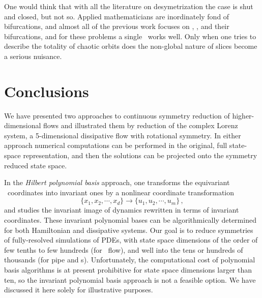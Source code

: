 \documentclass[preprint,number,sort&compress]{elsarticle}
\begin{document}
One would think that with all the literature on
desymetrization the case is shut and closed, but not so.
Applied mathematicians are inordinately fond of bifurcations,
and almost all of the previous work focuses on \eqva, \reqva,
and their bifurcations, and for these problems a single
\slice\ works well. Only when one tries to describe the
totality of chaotic orbits does the non-global nature of
slices become a serious nuisance.


\section{\label{sec:concl} Conclusions}

We have presented two approaches to continuous symmetry
reduction of higher-dimensional flows and illustrated them
by reduction of the complex Lorenz system, a 5-dimensional
dissipative flow with rotational symmetry.
In either approach numerical computations can be performed in
the original, full state-space representation, and then the
solutions can be projected onto the symmetry reduced state
space.

In the {\em Hilbert polynomial basis} approach, one transforms
the equi\-vari\-ant \statesp\ coordinates into in\-vari\-ant ones by
a nonlinear coordinate transformation
\[
\{x_1,x_2,\cdots,x_d\} \to \{u_1,u_2,\cdots,u_m\}
\,,
\]
and studies the in\-vari\-ant image of dynamics rewritten in
terms of in\-vari\-ant coordinates. These in\-vari\-ant polynomial
bases can be algorithmically determined for both Hamiltonian
and dissipative systems. Our goal is to reduce symmetries of
fully-resolved simulations of PDEs, with state space
dimensions of the order of few tenths to few hundreds (for
\KS\ flow), and well into the tens or hundreds of thousands (for pipe
and \pCf s). Unfortunately, the computational cost of
polynomial basis algorithms is at present prohibitive for
state space dimensions larger than ten, so the in\-vari\-ant
polynomial basis approach is not a feasible option. We have
discussed it here solely for illustrative purposes.
\end{document}
